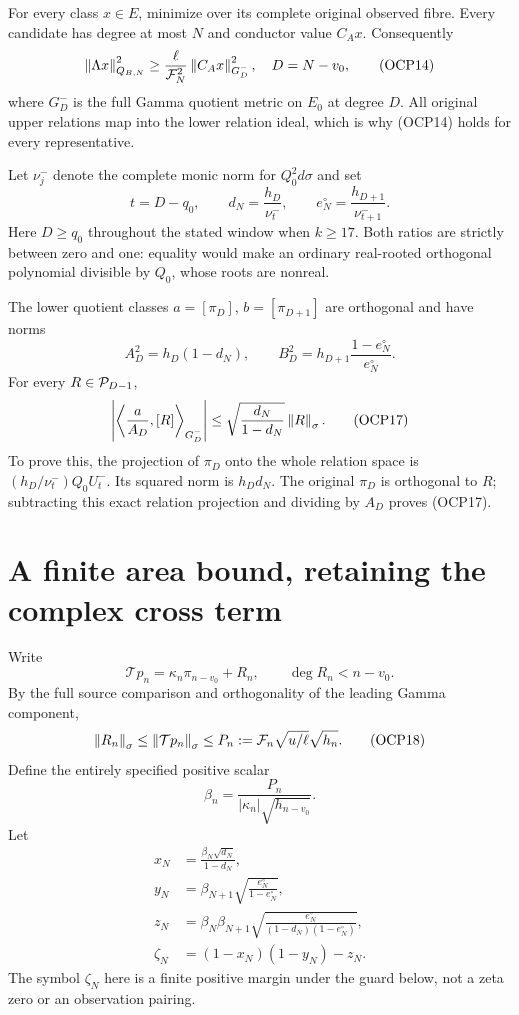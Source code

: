 \documentclass[10pt]{article}
\begin{document}
For every class $x\in E$, minimize over its complete original observed fibre. Every candidate has degree at most $N$ and conductor value $C_Ax$. Consequently
\[
 \left\lVert\Lambda x\right\rVert_{Q_{B,N}}^2
 \ge\frac{\ell}{\mathcal F_N^2}
\left\lVert C_Ax\right\rVert_{G^-_D}^2,
 \quad D=N-v_0,
 \tag{OCP14}
\]
where $G^-_D$ is the full Gamma quotient metric on $E_0$ at degree $D$. All original upper relations map into the lower relation ideal, which is why (OCP14) holds for every representative.

Let $\nu_j^-$ denote the complete monic norm for $Q_0^2d\sigma$ and set
\[
 t=D-q_0,\qquad
 d_N=\frac{h_D}{\nu_t^-},\qquad
 e_N^{\circ}=\frac{h_{D+1}}{\nu_{t+1}^-}.
 \tag{OCP15}
\]
Here $D\ge q_0$ throughout the stated window when $k\ge17$. Both ratios are strictly between zero and one: equality would make an ordinary real-rooted orthogonal polynomial divisible by $Q_0$, whose roots are nonreal.

The lower quotient classes $a=[\pi_D]$, $b=[\pi_{D+1}]$ are orthogonal and have norms
\[
 A_D^2=h_D(1-d_N),\qquad
 B_D^2=h_{D+1}\frac{1-e_N^{\circ}}{e_N^{\circ}}.
 \tag{OCP16}
\]
For every $R\in\mathcal P_{D-1}$,
\[
 \left|\left\langle\frac a{A_D},[R]\right\rangle_{G^-_D}\right|
 \le\sqrt{\frac{d_N}{1-d_N}}\left\lVert R\right\rVert_\sigma.
 \tag{OCP17}
\]
To prove this, the projection of $\pi_D$ onto the whole relation space is
$(h_D/\nu_t^-)Q_0U_t^-$. Its squared norm is $h_Dd_N$. The original $\pi_D$ is orthogonal to $R$; subtracting this exact relation projection and dividing by $A_D$ proves (OCP17).

\section{A finite area bound, retaining the complex cross term}
Write
\[
 \mathcal Tp_n=\kappa_n\pi_{n-v_0}+R_n,
 \qquad \deg R_n<n-v_0.
\]
By the full source comparison and orthogonality of the leading Gamma component,
\[
 \left\lVert R_n\right\rVert_\sigma\le\left\lVert\mathcal Tp_n\right\rVert_\sigma
 \le P_n:=\mathcal F_n\sqrt{u/\ell}\sqrt{h_n}.
 \tag{OCP18}
\]
Define the entirely specified positive scalar
\[
 \beta_n=\frac{P_n}{|\kappa_n|\sqrt{h_{n-v_0}}}.
\]
Let
\begin{align*}
 x_N&=\frac{\beta_N\sqrt{d_N}}{1-d_N},\\
 y_N&=\beta_{N+1}\sqrt{\frac{e_N^{\circ}}{1-e_N^{\circ}}},\\
 z_N&=\beta_N\beta_{N+1}
 \sqrt{\frac{e_N^{\circ}}{(1-d_N)(1-e_N^{\circ})}},\\
 \zeta_N&=(1-x_N)(1-y_N)-z_N.
\end{align*}
The symbol $\zeta_N$ here is a finite positive margin under the guard below, not a zeta zero or an observation pairing.
\end{document}

